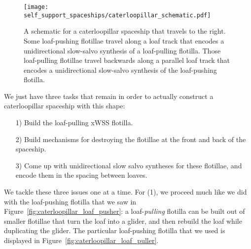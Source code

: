 \begin{figure}[!htbp]
	\centering
	\texttt{[image: self\_support\_spaceships/caterloopillar\_schematic.pdf]}
	\caption{A schematic for a caterloopillar spaceship that travels to the right. Some loaf-pushing flotillae travel along a loaf track that encodes a unidirectional slow-salvo synthesis of a loaf-pulling flotilla. Those loaf-pulling flotillae travel backwards along a parallel loaf track that encodes a unidirectional slow-salvo synthesis of the loaf-pushing flotilla.}\label{fig:caterloopillar_schematic}
\end{figure}

We just have three tasks that remain in order to actually construct a caterloopillar spaceship with this shape:\smallskip

\begin{itemize}
	\item[1)] Build the loaf-pulling xWSS flotilla.\smallskip
	
	\item[2)] Build mechanisms for destroying the flotillae at the front and back of the spaceship.\smallskip
	
	\item[3)] Come up with unidirectional slow salvo syntheses for these flotillae, and encode them in the spacing between loaves.\smallskip
\end{itemize}

We tackle these three issues one at a time. For (1), we proceed much like we did with the loaf-pushing flotilla that we saw in Figure~\ref{fig:caterloopillar_loaf_pusher}: a loaf-\emph{pulling} flotilla can be built out of smaller flotillae that turn the loaf into a glider, and then rebuild the loaf while duplicating the glider. The particular loaf-pushing flotilla that we used is displayed in Figure~\ref{fig:caterloopillar_loaf_puller}.

